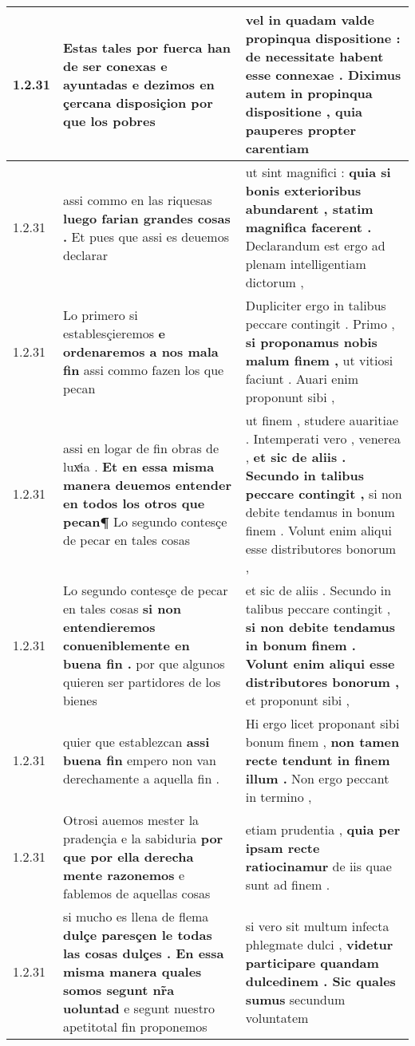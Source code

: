 \begin{tabular}{|p{1cm}|p{6.5cm}|p{6.5cm}|}
1.2.31 & Estas tales por fuerca han de ser conexas e ayuntadas \textbf{ e dezimos en çercana disposiçion } por que los pobres & vel in quadam valde propinqua dispositione : \textbf{ de necessitate habent esse connexae . Diximus autem in propinqua dispositione , } quia pauperes propter carentiam \\\hline
1.2.31 & assi commo en las riquesas \textbf{ luego farian grandes cosas . } Et pues que assi es deuemos declarar & ut sint magnifici : \textbf{ quia si bonis exterioribus abundarent , statim magnifica facerent . } Declarandum est ergo ad plenam intelligentiam dictorum , \\\hline
1.2.31 & Lo primero si establesçieremos \textbf{ e ordenaremos a nos mala fin } assi commo fazen los que pecan & Dupliciter ergo in talibus peccare contingit . Primo , \textbf{ si proponamus nobis malum finem , } ut vitiosi faciunt . Auari enim proponunt sibi , \\\hline
1.2.31 & assi en logar de fin obras de luxͣia . \textbf{ Et en essa misma manera deuemos entender en todos los otros que pecan¶ } Lo segundo contesçe de pecar en tales cosas & ut finem , studere auaritiae . Intemperati vero , venerea , \textbf{ et sic de aliis . Secundo in talibus peccare contingit , } si non debite tendamus in bonum finem . Volunt enim aliqui esse distributores bonorum , \\\hline
1.2.31 & Lo segundo contesçe de pecar en tales cosas \textbf{ si non entendieremos conueniblemente en buena fin . } por que algunos quieren ser partidores de los bienes & et sic de aliis . Secundo in talibus peccare contingit , \textbf{ si non debite tendamus in bonum finem . Volunt enim aliqui esse distributores bonorum , } et proponunt sibi , \\\hline
1.2.31 & quier que establezcan \textbf{ assi buena fin } empero non van derechamente a aquella fin . & Hi ergo licet proponant sibi bonum finem , \textbf{ non tamen recte tendunt in finem illum . } Non ergo peccant in termino , \\\hline
1.2.31 & Otrosi auemos mester la pradençia e la sabiduria \textbf{ por que por ella derecha mente razonemos } e fablemos de aquellas cosas & etiam prudentia , \textbf{ quia per ipsam recte ratiocinamur } de iis quae sunt ad finem . \\\hline
1.2.31 & si mucho es llena de flema \textbf{ dulçe paresçen le todas las cosas dulçes . En essa misma manera quales somos segunt nr̃a uoluntad } e segunt nuestro apetitotal fin proponemos & si vero sit multum infecta phlegmate dulci , \textbf{ videtur participare quandam dulcedinem . Sic quales sumus } secundum voluntatem \\\hline

\end{tabular}
